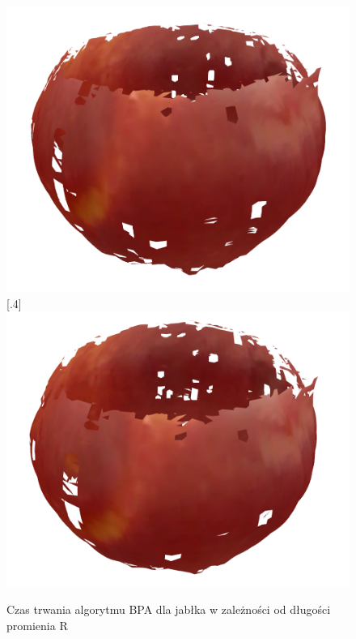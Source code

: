 \begin{figure}[H]
  [.4\linewidth]{\includegraphics[scale=0.3]{bpaApple7x.PNG}}
  [.4\linewidth]{\includegraphics[scale=0.3]{bpaApple10x.PNG}}
\caption{Czas trwania algorytmu BPA dla jabłka w zależności od długości promienia R}\label{fig:radiustimecomparisonApple}
\end{figure}

